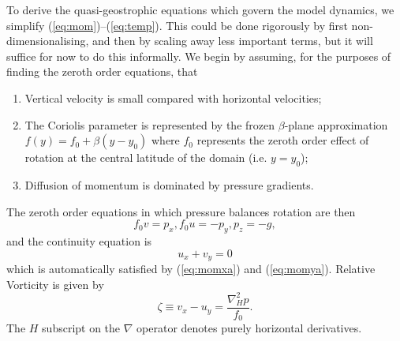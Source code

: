 \documentclass[11pt, a4paper,twoside]{article}
\numberwithin{equation}{section}
\begin{document}
To derive the quasi-geostrophic equations which govern the model dynamics, we simplify (\ref{eq:mom})--(\ref{eq:temp}).
This could be done rigorously by first non-dimensionalising, and then by scaling away less important terms, but it will suffice for now to do this informally.
We begin by assuming, for the purposes of finding the zeroth order equations, that
\begin{enumerate}
\item Vertical velocity is small compared with horizontal velocities;
\item The Coriolis parameter is represented by the frozen $\beta$-plane approximation $f(y)=f_0 + \beta (y - y_0)$ where $f_0$ represents the zeroth order effect of rotation at the central latitude of the domain (i.e. $y = y_0$);
\item Diffusion of momentum is dominated by pressure gradients.
\end{enumerate}
The zeroth order equations in which pressure balances rotation are then
\begin{subequations}
\begin{equation}\label{eq:momxa}
f_0v = p_x,
\end{equation}
\begin{equation}\label{eq:momya}
f_0 u = -p_y,
\end{equation}
\begin{equation}\label{eq:momza}
p_z = - g,
\end{equation}
\end{subequations}
and the continuity equation is
\begin{equation}\label{eq:conta}
u_x + v_y = 0
\end{equation}
which is automatically satisfied by (\ref{eq:momxa}) and (\ref{eq:momya}).
Relative Vorticity is given by
\begin{equation}\label{eq:vort}
\zeta \equiv v_x - u_y = \frac{\nabla_H^2 p}{f_0}.
\end{equation}
The $H$ subscript on the $\nabla$ operator denotes purely horizontal derivatives.
\end{document}
